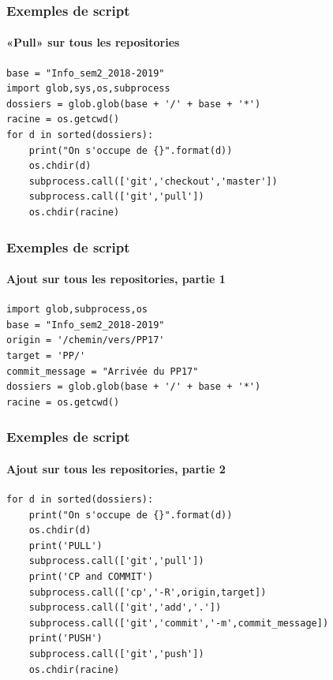 \begin{frame}[fragile]
	\frametitle{Exemples de script}
	\framesubtitle{«Pull» sur tous les repositories}

	\begin{code}
	\begin{verbatim}
base = "Info_sem2_2018-2019"
import glob,sys,os,subprocess
dossiers = glob.glob(base + '/' + base + '*')
racine = os.getcwd()
for d in sorted(dossiers):
    print("On s'occupe de {}".format(d))
    os.chdir(d)
    subprocess.call(['git','checkout','master'])
    subprocess.call(['git','pull'])
    os.chdir(racine)
	\end{verbatim}
	\end{code}
\end{frame}


\begin{frame}[fragile]
	\frametitle{Exemples de script}
	\framesubtitle{Ajout sur tous les repositories, partie 1}

	\begin{code}
	\begin{verbatim}
import glob,subprocess,os
base = "Info_sem2_2018-2019"
origin = '/chemin/vers/PP17'
target = 'PP/'
commit_message = "Arrivée du PP17"
dossiers = glob.glob(base + '/' + base + '*')
racine = os.getcwd()
	\end{verbatim}
	\end{code}
\end{frame}



\begin{frame}[fragile]
	\frametitle{Exemples de script}
	\framesubtitle{Ajout sur tous les repositories, partie 2}

	\begin{code}
	\begin{verbatim}
for d in sorted(dossiers):
    print("On s'occupe de {}".format(d))
    os.chdir(d)
    print('PULL')
    subprocess.call(['git','pull'])
    print('CP and COMMIT')
    subprocess.call(['cp','-R',origin,target])
    subprocess.call(['git','add','.'])
    subprocess.call(['git','commit','-m',commit_message])
    print('PUSH')
    subprocess.call(['git','push'])
    os.chdir(racine)
	\end{verbatim}
	\end{code}
\end{frame}


